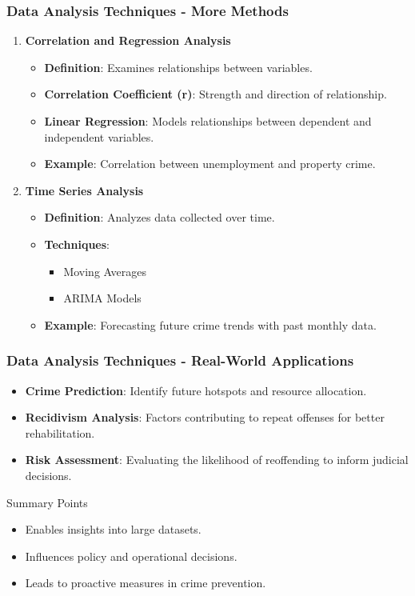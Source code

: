 \documentclass[aspectratio=169]{beamer}
\begin{document}
\begin{frame}[fragile]
    \frametitle{Data Analysis Techniques - More Methods}
    \begin{enumerate}[resume]
        \item \textbf{Correlation and Regression Analysis}
            \begin{itemize}
                \item \textbf{Definition}: Examines relationships between variables.
                \item \textbf{Correlation Coefficient (r)}: Strength and direction of relationship.
                \item \textbf{Linear Regression}: Models relationships between dependent and independent variables.
                \item \textbf{Example}: Correlation between unemployment and property crime.
            \end{itemize}
        \item \textbf{Time Series Analysis}
            \begin{itemize}
                \item \textbf{Definition}: Analyzes data collected over time.
                \item \textbf{Techniques}:
                    \begin{itemize}
                        \item Moving Averages
                        \item ARIMA Models
                    \end{itemize}
                \item \textbf{Example}: Forecasting future crime trends with past monthly data.
            \end{itemize}
    \end{enumerate}
\end{frame}

\begin{frame}[fragile]
    \frametitle{Data Analysis Techniques - Real-World Applications}
    \begin{itemize}
        \item \textbf{Crime Prediction}: Identify future hotspots and resource allocation.
        \item \textbf{Recidivism Analysis}: Factors contributing to repeat offenses for better rehabilitation.
        \item \textbf{Risk Assessment}: Evaluating the likelihood of reoffending to inform judicial decisions.
    \end{itemize}

    \begin{block}{Summary Points}
        \begin{itemize}
            \item Enables insights into large datasets.
            \item Influences policy and operational decisions.
            \item Leads to proactive measures in crime prevention.
        \end{itemize}
    \end{block}
\end{frame}
\end{document}
